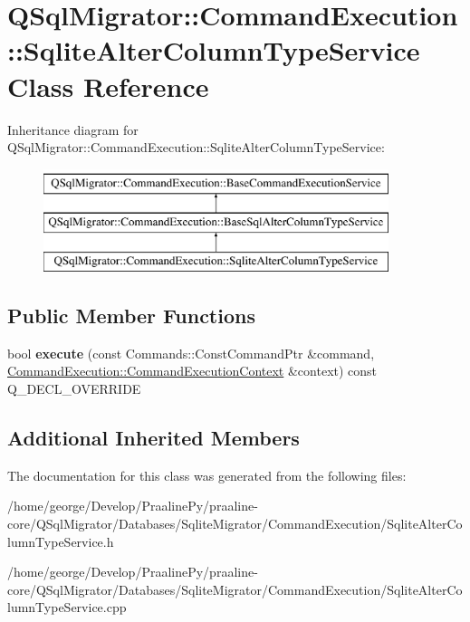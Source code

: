 \hypertarget{class_q_sql_migrator_1_1_command_execution_1_1_sqlite_alter_column_type_service}{}\section{Q\+Sql\+Migrator\+:\+:Command\+Execution\+:\+:Sqlite\+Alter\+Column\+Type\+Service Class Reference}
\label{class_q_sql_migrator_1_1_command_execution_1_1_sqlite_alter_column_type_service}
Inheritance diagram for Q\+Sql\+Migrator\+:\+:Command\+Execution\+:\+:Sqlite\+Alter\+Column\+Type\+Service\+:\begin{figure}[H]
\begin{center}
\leavevmode
\includegraphics[height=3.000000cm]{class_q_sql_migrator_1_1_command_execution_1_1_sqlite_alter_column_type_service}
\end{center}
\end{figure}
\subsection*{Public Member Functions}
\begin{DoxyCompactItemize}
\item 
\mbox{\label{class_q_sql_migrator_1_1_command_execution_1_1_sqlite_alter_column_type_service_a776f65eae402f05aa50808f0d7adbc58}} 
bool {\bfseries execute} (const Commands\+::\+Const\+Command\+Ptr \&command, \hyperlink{class_q_sql_migrator_1_1_command_execution_1_1_command_execution_context}{Command\+Execution\+::\+Command\+Execution\+Context} \&context) const Q\+\_\+\+D\+E\+C\+L\+\_\+\+O\+V\+E\+R\+R\+I\+DE
\end{DoxyCompactItemize}
\subsection*{Additional Inherited Members}


The documentation for this class was generated from the following files\+:\begin{DoxyCompactItemize}
\item 
/home/george/\+Develop/\+Praaline\+Py/praaline-\/core/\+Q\+Sql\+Migrator/\+Databases/\+Sqlite\+Migrator/\+Command\+Execution/Sqlite\+Alter\+Column\+Type\+Service.\+h\item 
/home/george/\+Develop/\+Praaline\+Py/praaline-\/core/\+Q\+Sql\+Migrator/\+Databases/\+Sqlite\+Migrator/\+Command\+Execution/Sqlite\+Alter\+Column\+Type\+Service.\+cpp\end{DoxyCompactItemize}

